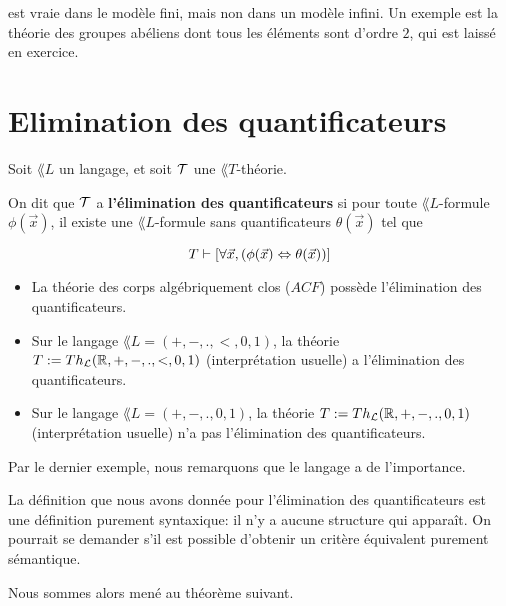\documentclass[a4paper, 12pt]{article}
\begin{document}
est vraie dans le modèle fini, mais non dans un modèle infini. Un exemple est
la théorie des groupes abéliens dont tous les éléments sont d'ordre $2$, qui est
laissé en exercice.


\section{Elimination des quantificateurs}

\begin{definition}
	\label{definition:elimination_quantificateurs}
	Soit $\lang{L}$ un langage, et soit $\mathcal{T}$ une $\lang{T}$-théorie.

	On dit que $\mathcal{T}$ a \textbf{l'élimination des quantificateurs} si
	pour toute $\lang{L}$-formule $\phi(\vec{x})$, il existe une
	$\lang{L}$-formule sans quantificateurs $\theta(\vec{x})$ tel que

	\begin{equation}
		T \vdash [\forall \vec{x}, (\phi(\vec{x}) \Leftrightarrow \theta(\vec{x}))]
	\end{equation}
\end{definition}

\begin{exemple}
	\begin{itemize}
		\item La théorie des corps algébriquement clos ($ACF$) possède l'élimination des
	quantificateurs.
		\item Sur le langage $\lang{L} = (+, -, ., <, 0, 1)$, la théorie $T :=
			Th_{\mathcal{L}}(\mathbb{R}, +, -, ., <, 0, 1)$ (interprétation usuelle) a
			l'élimination des quantificateurs.
		\item Sur le langage $\lang{L} = (+, -, ., 0, 1)$, la théorie $T :=
			Th_{\mathcal{L}}(\mathbb{R}, +, -, ., 0, 1)$ (interprétation usuelle) n'a pas
			l'élimination des quantificateurs.
	\end{itemize}
\end{exemple}

Par le dernier exemple, nous remarquons que le langage a de l'importance.

La définition que nous avons donnée pour l'élimination des quantificateurs est
une définition purement syntaxique: il n'y a aucune structure qui apparaît.
On pourrait se demander s'il est possible d'obtenir un critère équivalent
purement sémantique.

Nous sommes alors mené au théorème suivant.
\end{document}
